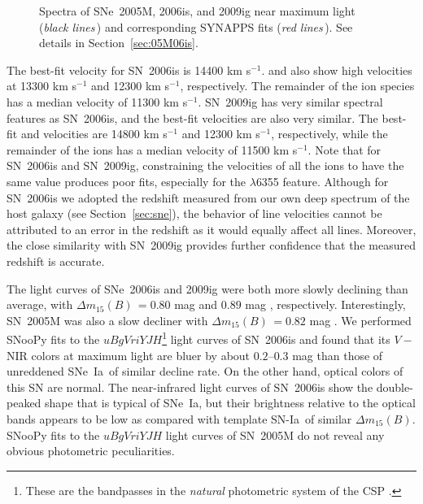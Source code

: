 \documentclass[apj]{emulateapj-rtx4}
\newcommand{\dm}{$\Delta m_{15}(B)$}
\newcommand{\sndia}{SN-Ia}
\newcommand{\sneia}{SNe~Ia}
\begin{document}
\begin{figure}[htpb]%
\caption{Spectra of SNe~2005M, 2006is, and 2009ig near maximum light
  ({\em black lines\,}) and corresponding SYNAPPS fits ({\em red lines\,}). See
  details in Section~\ref{sec:05M06is}.\label{fig:05M06is}} 
\end{figure}

The best-fit  velocity for SN~2006is is 14400
km s$^{-1}$.  and  also show high velocities at 13300
km s$^{-1}$ and 12300 km s$^{-1}$, respectively. The remainder of the
ion species has a median velocity of 11300 km s$^{-1}$. SN~2009ig has
very similar 
spectral features as SN~2006is, and the best-fit velocities are also
very similar. The best-fit  and  velocities are
14800 km s$^{-1}$ and 12300 km s$^{-1}$, respectively, while the
remainder of the ions has a median velocity of 11500 km
s$^{-1}$. Note that for SN~2006is and SN~2009ig, constraining the
velocities of all the ions to have the same value produces poor fits,
especially for the  $\lambda$6355 feature. Although
for SN~2006is we adopted the redshift measured from our own deep
spectrum of the host galaxy (see Section~\ref{sec:sne}), the
behavior of line velocities cannot be attributed to an error in the
redshift as it would equally affect all lines. Moreover, the close
similarity with SN~2009ig provides further confidence that the
measured redshift is accurate.

The light curves of SNe~2006is and 2009ig were both more slowly
declining than average, with \dm\,$=0.80$ mag \citep{stritzinger11}
and $0.89$ mag \citep{foley12}, respectively. Interestingly, SN~2005M was 
also a slow decliner with \dm\,$=0.82$ mag \citep{contreras10}. 
We performed SNooPy \citep{burns11} fits to
the $uBgVriYJH$\footnote{These are the bandpasses in the {\em natural}
photometric system of the CSP \citep[see][]{contreras10}.} light
curves of SN~2006is and found that its 
$V-$NIR colors at maximum light are bluer by about $0.2$--$0.3$ mag
than those of unreddened \sneia\ of similar decline rate. On the other
hand, optical colors of 
this SN are normal. The near-infrared light curves of SN~2006is show the 
double-peaked shape that is typical of \sneia, but their brightness
relative to the optical bands appears to be low as compared with template
\sndia\ of similar \dm. SNooPy fits to the $uBgVriYJH$ light curves
of SN~2005M do not reveal any obvious photometric peculiarities.
\end{document}
